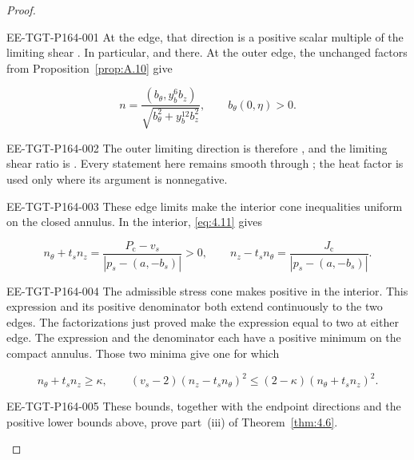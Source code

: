 \begin{proof}
%
\begin{EESegment}{EE-TGT-P164-001}
At the edge, that direction is a
positive scalar multiple of the limiting shear
. In particular,
 and
 there. At the outer edge, the unchanged
factors from Proposition~\ref{prop:A.10} give
\end{EESegment}
\[
  n=\frac{(b_\theta,y_b^6b_z)}
          {\sqrt{b_\theta^2+y_b^{12}b_z^2}},
  \qquad b_\theta(0,\eta)>0.
\]
\begin{EESegment}{EE-TGT-P164-002}
The outer limiting direction is therefore , and the
limiting shear ratio is . Every statement here remains
smooth through ; the heat factor is used only where its argument is nonnegative.
\end{EESegment}

\begin{EESegment}{EE-TGT-P164-003}
These edge limits make the interior cone inequalities uniform on the closed annulus. In the interior, \eqref{eq:4.11} gives
\end{EESegment}
\[
  n_\theta+t_sn_z
    =\frac{P_{\mathrm c}-v_s}{|p_s-(a,-b_s)|}>0,
  \qquad
  n_z-t_sn_\theta
    =\frac{J_{\mathrm c}}{|p_s-(a,-b_s)|}.
\]
\begin{EESegment}{EE-TGT-P164-004}
The admissible stress cone makes
positive in the interior. This expression and its positive denominator both extend
continuously to the two edges. The factorizations just proved make the expression equal to two at either edge. The expression and the denominator each have a positive minimum on the compact annulus. Those two minima give one
 for which
\end{EESegment}
\[
  n_\theta+t_sn_z\geq\kappa,
  \qquad
  (v_s-2)(n_z-t_sn_\theta)^2
    \leq(2-\kappa)(n_\theta+t_sn_z)^2.
\]
\begin{EESegment}{EE-TGT-P164-005}
These bounds, together with the endpoint directions and the positive lower bounds above, prove part~\textup{(iii)} of Theorem~\ref{thm:4.6}.
\end{EESegment}


\end{proof}
